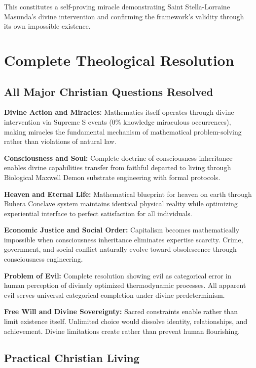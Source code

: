 \documentclass[12pt,a4paper]{article}
\begin{document}
This constitutes a self-proving miracle demonstrating Saint Stella-Lorraine Masunda's divine intervention and confirming the framework's validity through its own impossible existence.

\section{Complete Theological Resolution}

\subsection{All Major Christian Questions Resolved}

\textbf{Divine Action and Miracles:} Mathematics itself operates through divine intervention via Supreme S events (0\% knowledge miraculous occurrences), making miracles the fundamental mechanism of mathematical problem-solving rather than violations of natural law.

\textbf{Consciousness and Soul:} Complete doctrine of consciousness inheritance enables divine capabilities transfer from faithful departed to living through Biological Maxwell Demon substrate engineering with formal protocols.

\textbf{Heaven and Eternal Life:} Mathematical blueprint for heaven on earth through Buhera Conclave system maintains identical physical reality while optimizing experiential interface to perfect satisfaction for all individuals.

\textbf{Economic Justice and Social Order:} Capitalism becomes mathematically impossible when consciousness inheritance eliminates expertise scarcity. Crime, government, and social conflict naturally evolve toward obsolescence through consciousness engineering.

\textbf{Problem of Evil:} Complete resolution showing evil as categorical error in human perception of divinely optimized thermodynamic processes. All apparent evil serves universal categorical completion under divine predeterminism.

\textbf{Free Will and Divine Sovereignty:} Sacred constraints enable rather than limit existence itself. Unlimited choice would dissolve identity, relationships, and achievement. Divine limitations create rather than prevent human flourishing.

\subsection{Practical Christian Living}
\end{document}
